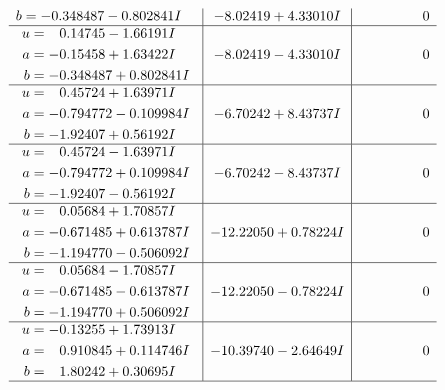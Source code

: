 \documentclass[1p]{elsarticle_modified}
\theoremstyle{definition}
\begin{document}
$$\begin{array}{c|c|c}
\begin{aligned}
b &= -0.348487 - 0.802841 I\end{aligned}
 & -8.02419 + 4.33010 I & \phantom{-0.000000 } 0 \\ \hline\begin{aligned}
u &= \phantom{-}0.14745 - 1.66191 I \\
a &= -0.15458 + 1.63422 I \\
b &= -0.348487 + 0.802841 I\end{aligned}
 & -8.02419 - 4.33010 I & \phantom{-0.000000 } 0 \\ \hline\begin{aligned}
u &= \phantom{-}0.45724 + 1.63971 I \\
a &= -0.794772 - 0.109984 I \\
b &= -1.92407 + 0.56192 I\end{aligned}
 & -6.70242 + 8.43737 I & \phantom{-0.000000 } 0 \\ \hline\begin{aligned}
u &= \phantom{-}0.45724 - 1.63971 I \\
a &= -0.794772 + 0.109984 I \\
b &= -1.92407 - 0.56192 I\end{aligned}
 & -6.70242 - 8.43737 I & \phantom{-0.000000 } 0 \\ \hline\begin{aligned}
u &= \phantom{-}0.05684 + 1.70857 I \\
a &= -0.671485 + 0.613787 I \\
b &= -1.194770 - 0.506092 I\end{aligned}
 & -12.22050 + 0.78224 I & \phantom{-0.000000 } 0 \\ \hline\begin{aligned}
u &= \phantom{-}0.05684 - 1.70857 I \\
a &= -0.671485 - 0.613787 I \\
b &= -1.194770 + 0.506092 I\end{aligned}
 & -12.22050 - 0.78224 I & \phantom{-0.000000 } 0 \\ \hline\begin{aligned}
u &= -0.13255 + 1.73913 I \\
a &= \phantom{-}0.910845 + 0.114746 I \\
b &= \phantom{-}1.80242 + 0.30695 I\end{aligned}
 & -10.39740 - 2.64649 I & \phantom{-0.000000 } 0\\
 \hline 
 \end{array}$$\newpage$$\begin{array}{c|c|c}  

\end{array}$$
\end{document}

